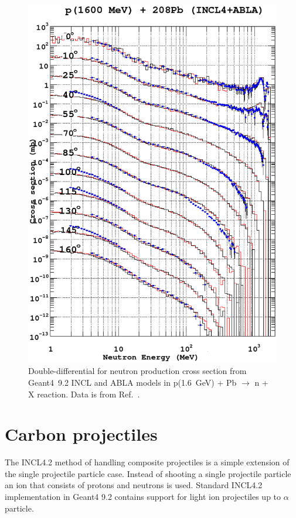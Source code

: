 \documentclass[a4paper]{jpconf}
\begin{document}
\begin{figure}
\begin{center}
\includegraphics[scale=0.70]{images/proton1600MeVPbv1.eps}
\caption{\label{fig:neutronPb}Double-differential for neutron production cross section
    from Geant4~9.2 INCL and ABLA models in p(1.6~GeV) + Pb $\rightarrow$ n + X reaction.
Data is from Ref.~\cite{data}.}

\end{center}

\end{figure}


\section{Carbon projectiles}\label{sec:carbon}
The INCL4.2 method of handling composite projectiles is a simple extension 
of the single projectile particle case. 
Instead of shooting a single projectile particle an ion that consists of protons and neutrons is used.
Standard INCL4.2 implementation in Geant4 9.2 contains support for light ion projectiles 
up to $\alpha$ particle.
\end{document}
